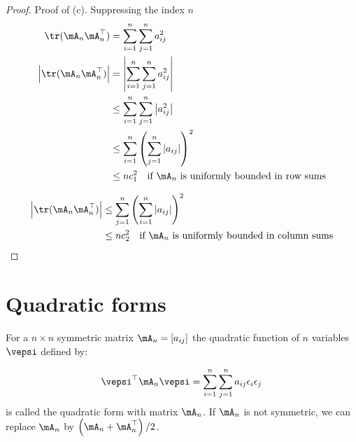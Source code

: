 \documentclass[english,12pt]{book}\usepackage[]{graphicx}\usepackage[]{xcolor}
\begin{document}
\begin{proof}
Proof of (c). Suppressing the index $n$
\begin{equation}
  \begin{aligned}
    \tr(\mA_n\mA_n^\top)               & = \sum_{i = 1}^n\sum_{j=1}^n a_{ij}^2 \\
    \left|\tr(\mA_n\mA_n^\top)\right|  & = \left|\sum_{i = 1}^n\sum_{j=1}^n a_{ij}^2\right| \\
     & \leq \sum_{i = 1}^n\sum_{j=1}^n\left|a_{ij}^2\right| \\
     & \leq \sum_{i = 1}^n\left(\sum_{j=1}^n\left|a_{ij}\right|\right) ^2 \\
     & \leq  n c_1^2\quad \mbox{if $\mA_n$ is uniformly bounded in row sums}
  \end{aligned}
\end{equation}


\begin{equation}
  \begin{aligned}
    \left|\tr(\mA_n\mA_n^\top)\right|  & \leq \sum_{j = 1}^n\left(\sum_{i=1}^n\left|a_{ij}\right|\right) ^2 \\
     & \leq  n c_2^2\quad \mbox{if $\mA_n$ is uniformly bounded in column sums}
  \end{aligned}
\end{equation}
\end{proof}

\section{Quadratic forms}

\begin{definition}\label{def:quad-form}
For a $n\times n$ symmetric matrix $\mA_n=\left[a_{ij}\right]$ the quadratic function of $n$ variables $\vepsi$ defined by:

\begin{equation}
\vepsi^\top \mA_n \vepsi = \sum_{i = 1}^n\sum_{j = 1}^na_{ij}\epsilon_i\epsilon_j
\end{equation}
%
is called the quadratic form with matrix $\mA_n$.  If $\mA_n$ is not symmetric, we can replace $\mA_n$ by $\left(\mA_n + \mA_n^\top\right)/2$.
\end{definition}
\end{document}

